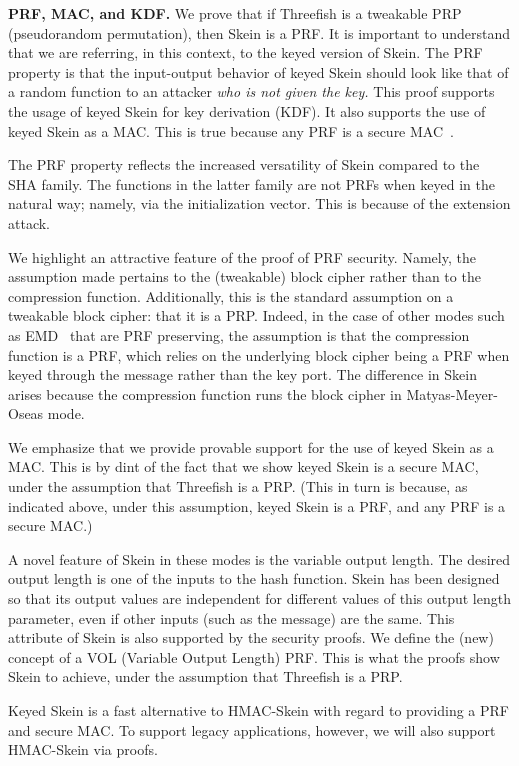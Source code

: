 \documentclass[11pt,twoside]{article}
\begin{document}
{\bf PRF, MAC, and KDF.}  We prove that if Threefish is a tweakable PRP (pseudorandom permutation), then Skein is a PRF. It is important to understand that we are referring, in this context, to the keyed version of Skein.  The PRF property is that the input-output behavior of keyed Skein should look like that of a random function to an attacker \textit{who is not given the key.}  This proof supports the usage of keyed Skein for key derivation (KDF).  It also supports the use of keyed Skein as a MAC.  This is true because any PRF is a secure MAC~\cite{BKR94}.

The PRF property reflects the increased versatility of Skein compared to the SHA family.  The functions in the latter family are not PRFs when keyed in the natural way; namely, via the initialization vector.  This is because of the extension attack.

We highlight an attractive feature of the proof of PRF security.  Namely, the assumption made pertains to the (tweakable) block cipher rather than to the compression function.  Additionally, this is the standard assumption on a tweakable block cipher: that it is a PRP.  Indeed, in the case of other modes such as EMD~\cite{BR06} that are PRF preserving, the assumption is that the compression function is a PRF, which relies on the underlying block cipher being a PRF when keyed through the message rather than the key port.  The difference in Skein arises because the compression function runs the block cipher in Matyas-Meyer-Oseas mode.

We emphasize that we provide provable support for the use of keyed Skein as a MAC. This is by dint of the fact that we show keyed Skein is a secure MAC, under the assumption that Threefish is a PRP. (This in turn is because, as indicated above, under this assumption, keyed Skein is a PRF, and any PRF is a secure MAC.)

A novel feature of Skein in these modes is the variable output length.  The desired output length is one of the inputs to the hash function.  Skein has been designed so that its output values are independent for different values of this output length parameter, even if other inputs (such as the message) are the same.  This attribute of Skein is also supported by the security proofs.  We define the (new) concept of a VOL (Variable Output Length) PRF.  This is what the proofs show Skein to achieve, under the assumption that Threefish is a PRP.

Keyed Skein is a fast alternative to HMAC-Skein with regard to providing a PRF and secure MAC.  To support legacy applications, however, we will also support HMAC-Skein via proofs.
\end{document}
